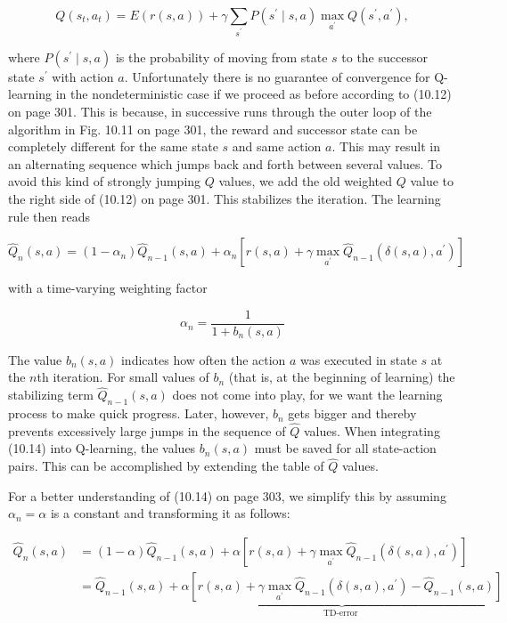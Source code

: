 \documentclass[10pt]{article}
\begin{document}
\begin{equation*}
Q\left(s_{t}, a_{t}\right)=E(r(s, a))+\gamma \sum_{s^{\prime}} P\left(s^{\prime} \mid s, a\right) \max _{a^{\prime}} Q\left(s^{\prime}, a^{\prime}\right), \tag{10.13}
\end{equation*}


where $P\left(s^{\prime} \mid s, a\right)$ is the probability of moving from state $s$ to the successor state $s^{\prime}$ with action $a$. Unfortunately there is no guarantee of convergence for Q-learning in the nondeterministic case if we proceed as before according to (10.12) on page 301. This is because, in successive runs through the outer loop of the algorithm in Fig. 10.11 on page 301, the reward and successor state can be completely different for the same state $s$ and same action $a$. This may result in an alternating sequence which jumps back and forth between several values. To avoid this kind of strongly jumping $Q$ values, we add the old weighted $Q$ value to the right side of (10.12) on page 301. This stabilizes the iteration. The learning rule then reads


\begin{equation*}
\hat{Q}_{n}(s, a)=\left(1-\alpha_{n}\right) \hat{Q}_{n-1}(s, a)+\alpha_{n}\left[r(s, a)+\gamma \max _{a^{\prime}} \hat{Q}_{n-1}\left(\delta(s, a), a^{\prime}\right)\right] \tag{10.14}
\end{equation*}


with a time-varying weighting factor

$$
\alpha_{n}=\frac{1}{1+b_{n}(s, a)}
$$

The value $b_{n}(s, a)$ indicates how often the action $a$ was executed in state $s$ at the $n$th iteration. For small values of $b_{n}$ (that is, at the beginning of learning) the stabilizing term $\hat{Q}_{n-1}(s, a)$ does not come into play, for we want the learning process to make quick progress. Later, however, $b_{n}$ gets bigger and thereby prevents excessively large jumps in the sequence of $\hat{Q}$ values. When integrating (10.14) into Q-learning, the values $b_{n}(s, a)$ must be saved for all state-action pairs. This can be accomplished by extending the table of $\hat{Q}$ values.

For a better understanding of (10.14) on page 303, we simplify this by assuming $\alpha_{n}=\alpha$ is a constant and transforming it as follows:


$$
\begin{aligned}
\hat{Q}_{n}(s, a) & =(1-\alpha) \hat{Q}_{n-1}(s, a)+\alpha\left[r(s, a)+\gamma \max _{a^{\prime}} \hat{Q}_{n-1}\left(\delta(s, a), a^{\prime}\right)\right] \\
& =\hat{Q}_{n-1}(s, a)+\underbrace{\alpha\left[r(s, a)+\gamma \max _{a^{\prime}} \hat{Q}_{n-1}\left(\delta(s, a), a^{\prime}\right)-\hat{Q}_{n-1}(s, a)\right]}_{\text {TD-error }}
\end{aligned}
$$
\end{document}

